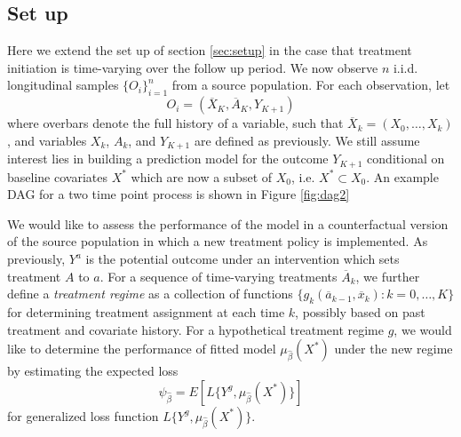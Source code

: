 \subsection{Set up}
Here we extend the set up of section \ref{sec:setup} in the case that treatment initiation is time-varying over the follow up period. We now observe $n$ i.i.d. longitudinal samples $\{O_i\}_{i=1}^n$ from a source population. For each observation, let 
\[O_i =(\overline{X}_K, \overline{A}_K, Y_{K+1})\]
where overbars denote the full history of a variable, such that $\overline{X}_k = (X_0,\dots, X_k)$, and variables $X_k$, $A_k$, and $Y_{K+1}$ are defined as previously. We still assume interest lies in building a prediction model for the outcome $Y_{K+1}$ conditional on baseline covariates $X^*$ which are now a subset of $X_0$, i.e. $X^* \subset X_0$. An example DAG for a two time point process is shown in Figure \ref{fig:dag2} 

We would like to assess the performance of the model in a counterfactual version of the source population in which a new treatment policy is implemented. As previously, $Y^a$ is the potential outcome under an intervention which sets treatment $A$ to $a$. For a sequence of time-varying treatments $\overline{A}_k$, we further define a \textit{treatment regime} as a collection of functions $\{g_k(\overline{a}_{k-1}, \overline{x}_k): k=0,\ldots, K\}$ for determining treatment assignment at each time $k$, possibly based on past treatment and covariate history. For a hypothetical treatment regime $g$, we would like to determine the performance of fitted model $\mu_{\widehat{\beta}}(X^*)$ under the new regime by estimating the expected loss 
$$\psi_{\widehat{\beta}} = E[L\{Y^g, \mu_{\widehat{\beta}}(X^*)\}]$$
for generalized loss function $L\{Y^g, \mu_{\widehat{\beta}}(X^*)\}$.


